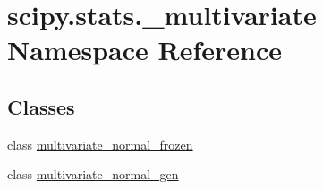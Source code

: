 \hypertarget{namespacescipy_1_1stats_1_1__multivariate}{}\section{scipy.\+stats.\+\_\+multivariate Namespace Reference}
\label{namespacescipy_1_1stats_1_1__multivariate}
\subsection*{Classes}
\begin{DoxyCompactItemize}
\item 
class \hyperlink{classscipy_1_1stats_1_1__multivariate_1_1multivariate__normal__frozen}{multivariate\+\_\+normal\+\_\+frozen}
\item 
class \hyperlink{classscipy_1_1stats_1_1__multivariate_1_1multivariate__normal__gen}{multivariate\+\_\+normal\+\_\+gen}
\end{DoxyCompactItemize}
